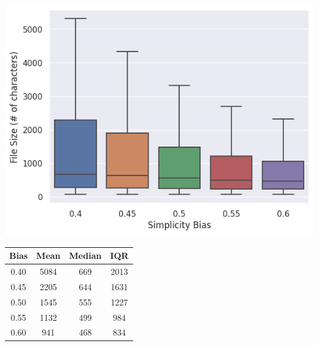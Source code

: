 \begin{minipage}{\textwidth}
  \begin{minipage}[b]{0.49\textwidth}
    \centering
    \includegraphics[scale=0.4]{img/rq1-1/boxplot_size.png}
    \label{fig:rq1-1size-dist}
  \end{minipage}
  \hfill
  \begin{minipage}[b]{0.49\textwidth}
    \centering
\begin{tabular}{c|ccc}
    Bias & Mean & Median & \gls{IQR}\\
    \midrule
    0.40 & 5084 & 669 & 2013\\
    0.45 & 2205 & 644 & 1631\\
    0.50 & 1545 & 555 & 1227\\
    0.55 & 1132 & 499 & 984\\
    0.60 & 941 & 468 & 834
\end{tabular}
\vfill
  \label{tab:rq1-1size-dist}
\end{minipage}
\end{minipage}

